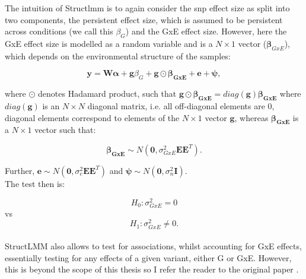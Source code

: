 The intuition of Struct\gls{lmm} is to again consider the \gls{snp} effect size as split into two components, the persistent effect size, which is assumed to be persistent across conditions (we call this $\beta_G$) and the GxE effect size. 
However, here the GxE effect size is modelled as a random variable and is a $N \times 1$ vector ($\boldsymbol{\beta}_{GxE}$), which depends on the environmental structure of the samples:

\begin{equation}\label{eq:StructLMM-int}
 \mathbf{y} =  \mathbf{W}\boldsymbol{\alpha} + \mathbf{g}\beta_G + \mathbf{g} \odot \boldsymbol{\beta_{GxE}} + \mathbf{e} + \boldsymbol{\psi}, 
\end{equation}

where $\odot$ denotes Hadamard product, such that $\mathbf{g} \odot \boldsymbol{\beta_{GxE}} = diag(\mathbf{g})\boldsymbol{\beta_{GxE}}$ where $diag(\mathbf{g})$ is an $N \times N$ diagonal matrix, i.e. all off-diagonal elements are 0, diagonal elements correspond to elements of the $N \times 1$ vector $\mathbf{g}$, whereas $\boldsymbol{\beta_{GxE}}$ is a $N \times 1$ vector such that:

\begin{equation}\label{eq:StructLMM-int_beta_GxE}
    \boldsymbol{\beta_{GxE}} \sim N(\mathbf{0}, \sigma^2_{GxE}\mathbf{E}\mathbf{E}^T).
\end{equation}

Further, $\mathbf{e} \sim N(\mathbf{0}, \sigma^2_{e}\mathbf{E}\mathbf{E}^T)$ and $\boldsymbol{\psi} \sim N(\mathbf{0}, \sigma^2_{n}\mathbf{I})$. \\


The test then is:

\begin{equation}\label{eq:StructLMM-int_H0}
 H_{0}: \sigma^2_{GxE}=0 
\end{equation}
vs
\begin{equation}\label{eq:StructLMM-int_H1}
 H_{1}: \sigma^2_{GxE} \neq 0. 
\end{equation}\\

StructLMM also allows to test for associations, whilst accounting for GxE effects, essentially testing for any effects of a given variant, either G or GxE.
However, this is beyond the scope of this thesis so I refer the reader to the original paper \cite{moore2019linear}.\\

